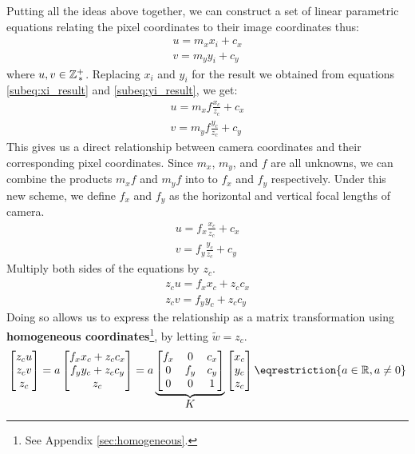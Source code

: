 Putting all the ideas above together, we can construct a set of linear parametric equations relating the pixel coordinates to their image coordinates thus:
\begin{align*}
    u = m_x x_i + c_x \\
    v = m_y y_i + c_y
\end{align*}
where $u, v \in \mathbb{Z}^+_{\,*}$. Replacing $x_i$ and $y_i$ for the result we obtained from equations \ref{subeq:xi_result} and \ref{subeq:yi_result}, we get:
\begin{align*}
    u = m_x f \frac{x_c}{z_c} + c_x \\
    v = m_y f \frac{y_c}{z_c} + c_y
\end{align*}
This gives us a direct relationship between camera coordinates and their corresponding pixel coordinates. Since $m_x$, $m_y$, and $f$ are all unknowns, we can combine the products $m_x f$ and $m_y f$ into to $f_x$ and $f_y$ respectively. Under this new scheme, we define $f_x$ and $f_y$ as the horizontal and vertical focal lengths of camera.
\begin{subequations}
    \begin{gather*}
        u = f_x \frac{x_c}{z_c} + c_x \\
        v = f_y \frac{y_c}{z_c} + c_y
    \end{gather*}
\end{subequations}
Multiply both sides of the equations by $z_c$.
\begin{subequations}
    \begin{gather*}
        z_c u = f_x x_c + z_c c_x \\
        z_c v = f_y y_c + z_c c_y
    \end{gather*}
\end{subequations}
Doing so allows us to express the relationship as a matrix transformation using \textbf{homogeneous coordinates}\footnote{See Appendix \ref{sec:homogeneous}.}, by letting $\widetilde{w} = z_c$.
\begin{equation} \label{eq:cali}
    \begin{bmatrix}
        z_c u \\ z_c v \\ z_c
    \end{bmatrix}
    =
    a
    \begin{bmatrix}
        f_x x_c + z_c c_x \\ f_y y_c + z_c c_y \\ z_c
    \end{bmatrix}
    =
    a
    \underbrace{
        \begin{bmatrix}
            f_x & 0   & c_x \\
            0   & f_y & c_y \\
            0   & 0   & 1
        \end{bmatrix}
    }_{\mathlarger{K}}
    \begin{bmatrix}
        x_c \\ y_c \\ z_c
    \end{bmatrix}
    \eqrestriction{a \in \Real, a \neq 0}
\end{equation}

